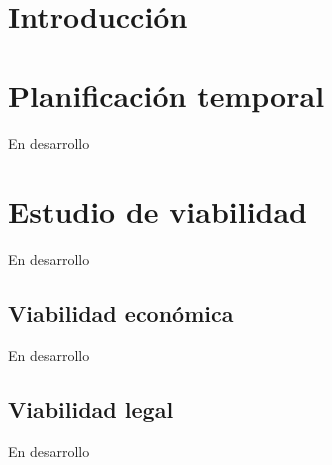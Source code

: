 
\section{Introducción}

\section{Planificación temporal}
En desarrollo

\section{Estudio de viabilidad}
En desarrollo

\subsection{Viabilidad económica}
En desarrollo

\subsection{Viabilidad legal}
En desarrollo


